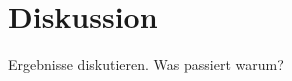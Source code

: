 \chapter{Diskussion}
\label{chap:Diskussion}
\pagestyle{plain}

Ergebnisse diskutieren. Was passiert warum?